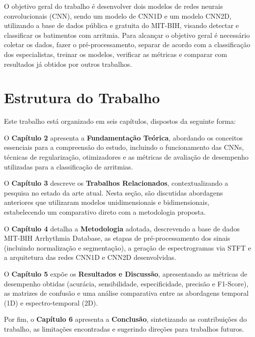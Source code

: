 O objetivo geral do trabalho é desenvolver dois modelos de redes neurais convolucionais (CNN), sendo um modelo de CNN1D e um modelo CNN2D, 
utilizando a base de dados pública e gratuita do MIT-BIH, visando detectar e classificar os batimentos com arritmia. Para alcançar o objetivo geral 
é necessário coletar os dados, fazer o pré-processamento, separar de acordo com a classificação dos especialistas, treinar os modelos, verificar
as métricas e comparar com resultados já obtidos por outros trabalhos. 

\section{Estrutura do Trabalho}

Este trabalho está organizado em seis capítulos, dispostos da seguinte forma:

O \textbf{Capítulo 2} apresenta a \textbf{Fundamentação Teórica}, abordando os conceitos essenciais para a compreensão do estudo, incluindo o 
funcionamento das CNNs, técnicas de regularização, otimizadores e as métricas de avaliação de desempenho utilizadas para a classificação de arritmias.

O \textbf{Capítulo 3} descreve os \textbf{Trabalhos Relacionados}, contextualizando a pesquisa no estado da arte atual. Nesta seção, são discutidas 
abordagens anteriores que utilizaram modelos unidimensionais e bidimensionais, estabelecendo um comparativo direto com a metodologia proposta.

O \textbf{Capítulo 4} detalha a \textbf{Metodologia} adotada, descrevendo a base de dados MIT-BIH Arrhythmia Database, as etapas de pré-processamento 
dos sinais (incluindo normalização e segmentação), a geração de espectrogramas via STFT e a arquitetura das redes CNN1D e CNN2D desenvolvidas.

O \textbf{Capítulo 5} expõe os \textbf{Resultados e Discussão}, apresentando as métricas de desempenho obtidas (acurácia, sensibilidade, especificidade, 
precisão e F1-Score), as matrizes de confusão e uma análise comparativa entre as abordagens temporal (1D) e espectro-temporal (2D).

Por fim, o \textbf{Capítulo 6} apresenta a \textbf{Conclusão}, sintetizando as contribuições do trabalho, as limitações encontradas e sugerindo 
direções para trabalhos futuros.